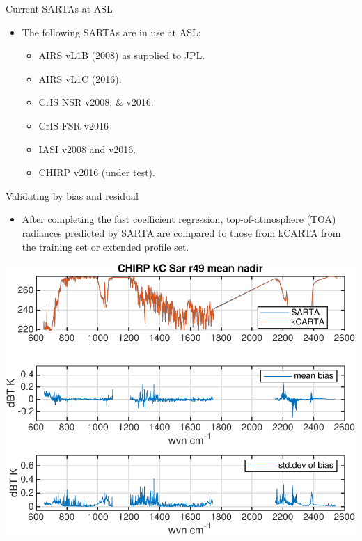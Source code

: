\documentclass[10pt,t]{beamer}
\begin{document}
\begin{frame}{Current SARTAs at ASL}

  \begin{itemize}
  \item The following SARTAs are in use at ASL:
    \begin{itemize}
    \item AIRS vL1B (2008) as supplied to JPL.
    \item AIRS vL1C (2016).
    \item CrIS NSR v2008, \& v2016.
    \item CrIS FSR v2016
    \item IASI v2008 and v2016.
    \item CHIRP v2016 (under test).
    \end{itemize}
  \end{itemize}
  

\end{frame}
\begin{frame}{Validating by bias and residual}

  \begin{itemize}
  \item After completing the fast coefficient regression, top-of-atmosphere (TOA) radiances predicted by SARTA are compared to those from kCARTA from the training set or extended profile set.
  \end{itemize}
      \begin{center}
    \includegraphics[width=0.6\linewidth]{./Figs/chirp_49regr_sar_kc_bias_stdv.pdf}
  \end{center}
  

\end{frame}
\end{document}

